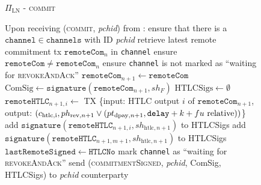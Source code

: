   \begin{figure}[H]
    \begin{protocolbox}{$\Pi_{\mathrm{LN}}$ - \textsc{commit}}
      \begin{algorithmic}[1]
        \State Upon receiving (\textsc{commit}, \textit{pchid}) from
        \environment:
        \Indent
          \State ensure that there is a $\mathtt{channel} \in \mathtt{channels}$
          with ID \textit{pchid}
          \State retrieve latest remote commitment tx $\mathtt{remoteCom}_n$ in
          \texttt{channel}
          \State ensure $\mathtt{remoteCom} \neq \mathtt{remoteCom}_n$
          \State ensure \texttt{channel} is not marked as ``waiting for
          \textsc{revokeAndAck}''
          \State $\mathtt{remoteCom}_{n+1} \gets \mathtt{remoteCom}$
          \State $\mathrm{ComSig} \gets
          \mathtt{signature}\left(\mathtt{remoteCom}_{n+1}, sh_F\right)$
          \State $\mathrm{HTLCSigs} \gets \emptyset$
            \State $\mathtt{remoteHTLC}_{n+1, i} \gets$ TX \{input: HTLC output
            $i$ of $\mathtt{remoteCom}_{n+1}$, output: $\left(c_{\mathrm{htlc,
            i}}, ph_{\mathrm{rev}, n+1} \vee \left(pt_{\mathrm{dpay}, n+1},
            \mathtt{delay} + k + fu{} \text{ relative}\right)\right)$\}
            \State add $\mathtt{signature}\left(\mathtt{remoteHTLC}_{n+1, i},
            sh_{\mathrm{htlc}, n+1}\right)$ to HTLCSigs
          \EndFor
          \State add $\mathtt{signature}\left(\mathtt{remoteHTLC}_{n+1, m+1},
          sh_{\mathrm{htlc}, n+1}\right)$ to HTLCSigs
          \State $\mathtt{lastRemoteSigned} \gets \mathtt{HTLCNo}$
          \State mark \texttt{channel} as ``waiting for \textsc{revokeAndAck}''
          \State send (\textsc{commitmentSigned}, \textit{pchid}, ComSig,
          HTLCSigs) to \textit{pchid} counterparty
        \EndIndent
      \end{algorithmic}
    \end{protocolbox}
    \caption{}
    \label{alg:protocol:pay:commit}
  \end{figure}

